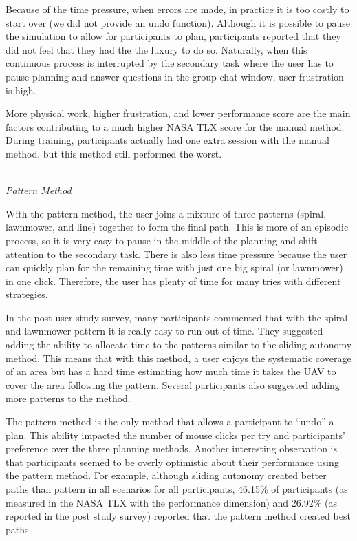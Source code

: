 \documentclass[lettersize, apacite, twoside, HRI]{apa_HRI}
\begin{document}
Because of the time pressure, when errors are made, in practice it is too costly to start over (we did not provide an undo function). Although it is possible to pause the simulation to allow for participants to plan, participants reported that they did not feel that they had the the luxury to do so. Naturally, when this continuous process is interrupted by the secondary task where the user has to pause planning and answer questions in the group chat window, user frustration is high. 

More physical work, higher frustration, and lower performance score are the main factors contributing to a much higher NASA TLX score for the manual method. During training, participants actually had one extra session with the manual method, but this method still performed the worst.

~\\ \noindent \textit{Pattern Method}

With the pattern method, the user joins a mixture of three patterns (spiral, lawnmower, and line) together to form the final path. This is more of an episodic process, so it is very easy to pause in the middle of the planning and shift attention to the secondary task. There is also less time pressure because the user can quickly plan for the remaining time with just one big spiral (or lawnmower) in one click. Therefore, the user has plenty of time for many tries with different strategies.

In the post user study survey, many participants commented that with the spiral and lawnmower pattern it is really easy to run out of time. They suggested adding the ability to allocate time to the patterns similar to the sliding autonomy method. This means that with this method, a user enjoys the systematic coverage of an area but has a hard time estimating how much time it takes the UAV to cover the area following the pattern. Several participants also suggested adding more patterns to the method. 

The pattern method is the only method that allows a participant to ``undo'' a plan. This ability impacted the number of mouse clicks per try and participants' preference over the three planning methods. Another interesting observation is that participants seemed to be overly optimistic about their performance using the pattern method. For example, although sliding autonomy created better paths than pattern in all scenarios for all participants, 46.15\% of participants (as measured in the NASA TLX with the performance dimension) and 26.92\% (as reported in the post study survey) reported that the pattern method created best paths.
\end{document}

